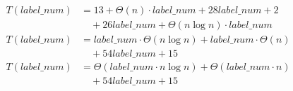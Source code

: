 \begin{subequations}
\label{eq:analyse-detectmarker2-3}
\begin{align}
\label{eq:analyse-detectmarker2-3-1}
T(\mathit{label\_num})& =
13
+ \Theta(n) \cdot \mathit{label\_num} + 28 \mathit{label\_num} + 2
\\
& \quad
+ 26 \mathit{label\_num}
+ \Theta(n \log n) \cdot \mathit{label\_num}
\nonumber \\
\label{eq:analyse-detectmarker2-3-2}
T(\mathit{label\_num})& =
\mathit{label\_num} \cdot \Theta(n \log n) + \mathit{label\_num} \cdot \Theta(n)
\\
& \quad
+ 54\mathit{label\_num} + 15
\nonumber \\
\label{eq:analyse-detectmarker2-3-3}
T(\mathit{label\_num})& =
\Theta(\mathit{label\_num} \cdot n \log n) + \Theta(\mathit{label\_num} \cdot n)
\\
& \quad
+ 54\mathit{label\_num} + 15
\nonumber
\end{align}
\end{subequations}
